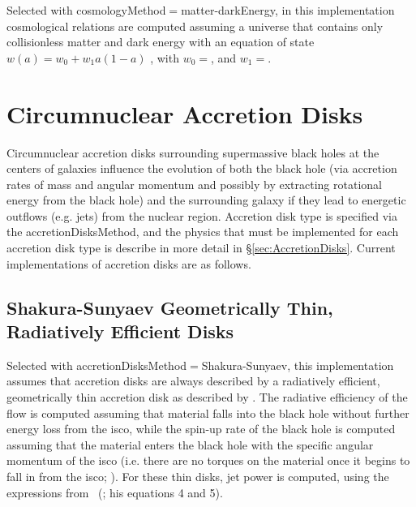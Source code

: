 Selected with {\normalfont \ttfamily cosmologyMethod}$=${\normalfont \ttfamily matter-darkEnergy}, in this implementation cosmological relations are computed assuming a universe that contains only collisionless matter and dark energy with an equation of state $w(a)=w_0+w_1a(1-a)$ \citep{jassal_wmap_2005}, with $w_0=${\normalfont \ttfamily [darkEnergyEquationOfStateW0]}, and $w_1=${\normalfont \ttfamily [darkEnergyEquationOfStateW1]}.

\section{Circumnuclear Accretion Disks}\label{sec:CircumnuclearDisks}

Circumnuclear accretion disks surrounding supermassive black holes at the centers of galaxies influence the evolution of both the black hole (via accretion rates of mass and angular momentum and possibly by extracting rotational energy from the black hole) and the surrounding galaxy if they lead to energetic outflows (e.g. jets) from the nuclear region. Accretion disk type is specified via the {\normalfont \ttfamily accretionDisksMethod}, and the physics that must be implemented for each accretion disk type is describe in more detail in \S\ref{sec:AccretionDisks}. Current implementations of accretion disks are as follows.

\subsection{Shakura-Sunyaev Geometrically Thin, Radiatively Efficient Disks}

Selected with {\normalfont \ttfamily accretionDisksMethod}$=${\normalfont \ttfamily Shakura-Sunyaev}, this implementation assumes that accretion disks are always described by a radiatively efficient, geometrically thin accretion disk as described by \cite{shakura_black_1973}. The radiative efficiency of the flow is computed assuming that material falls into the black hole without further energy loss from the \gls{isco}, while the spin-up rate of the black hole is computed assuming that the material enters the black hole with the specific angular momentum of the \gls{isco} (i.e. there are no torques on the material once it begins to fall in from the \gls{isco}; \citealt{bardeen_kerr_1970}). For these thin disks, jet power is computed, using the expressions from \citeauthor{meier_association_2001}~(\citeyear{meier_association_2001}; his equations 4 and 5).

